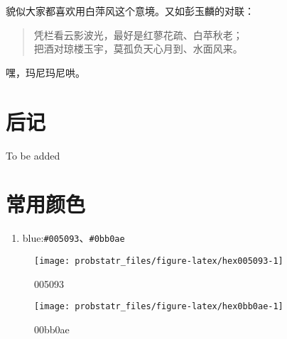 \documentclass[]{ctexbook}
\newenvironment{Shaded}{\begin{snugshade}}{\end{snugshade}}
\newcommand{\ControlFlowTok}[1]{\textcolor[rgb]{0.13,0.29,0.53}{\textbf{#1}}}
\newcommand{\DataTypeTok}[1]{\textcolor[rgb]{0.13,0.29,0.53}{#1}}
\newcommand{\KeywordTok}[1]{\textcolor[rgb]{0.13,0.29,0.53}{\textbf{#1}}}
\newcommand{\NormalTok}[1]{#1}
\newcommand{\OperatorTok}[1]{\textcolor[rgb]{0.81,0.36,0.00}{\textbf{#1}}}
\newcommand{\StringTok}[1]{\textcolor[rgb]{0.31,0.60,0.02}{#1}}
\providecommand{\tightlist}{%
  \setlength{\itemsep}{0pt}\setlength{\parskip}{0pt}}
\begin{document}
貌似大家都喜欢用白萍风这个意境。又如彭玉麟的对联：

\begin{quote}
凭栏看云影波光，最好是红蓼花疏、白苹秋老；\\
把酒对琼楼玉宇，莫孤负天心月到、水面风来。
\end{quote}

嘿，玛尼玛尼哄。

\cleardoublepage

\hypertarget{appendix-}{%
\appendix {}}


\hypertarget{sound}{%
\chapter{后记}\label{sound}}

To be added

\hypertarget{colors}{%
\chapter{常用颜色}\label{colors}}

\begin{enumerate}
\def\labelenumi{\arabic{enumi}.}
\setcounter{enumi}{1}
\tightlist
\item
  blue:\texttt{\#005093}、\texttt{\#0bb0ae}
\end{enumerate}

\begin{Shaded}
\end{Shaded}

\begin{figure}

{\centering \texttt{[image: probstatr\_files/figure-latex/hex005093-1]} 

}

\caption{005093}\label{fig:hex005093}
\end{figure}

\begin{figure}

{\centering \texttt{[image: probstatr\_files/figure-latex/hex0bb0ae-1]} 

}

\caption{00bb0ae}\label{fig:hex0bb0ae}
\end{figure}
\end{document}
